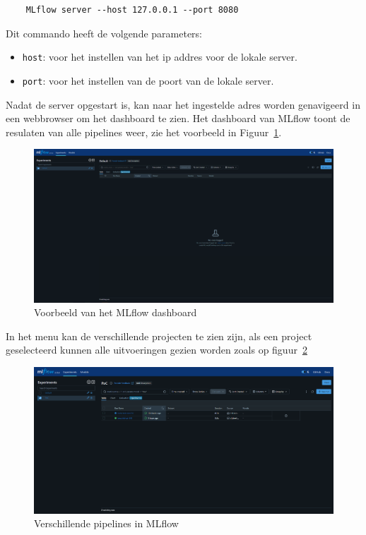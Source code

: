 \begin{verbatim}
    MLflow server --host 127.0.0.1 --port 8080
\end{verbatim}

Dit commando heeft de volgende parameters:

\begin{itemize}
    \item \texttt{host}: voor het instellen van het ip addres voor de lokale server.
    \item \texttt{port}: voor het instellen van de poort van de lokale server.
\end{itemize}

Nadat de server opgestart is, kan naar het ingestelde adres worden genavigeerd in een webbrowser om het dashboard te zien. Het dashboard van MLflow toont de resulaten van alle pipelines weer, zie het voorbeeld in Figuur~\ref{fig:MLflow_dashboard}.

\begin{figure}
    \centering
    \includegraphics[width=0.9\linewidth]{graphics/MLflow_dashboard.PNG}
    \caption{Voorbeeld van het MLflow dashboard}
    \label{fig:MLflow_dashboard}
\end{figure}

In het menu kan de verschillende projecten te zien zijn, als een project geselecteerd kunnen alle uitvoeringen gezien worden zoals op figuur~\ref{fig:MLflow_runs}
\begin{figure}
    \centering
    \includegraphics[width=0.9\linewidth]{graphics/MLflow_Runs.PNG}
    \caption{Verschillende pipelines in MLflow}
    \label{fig:MLflow_runs}
\end{figure}

